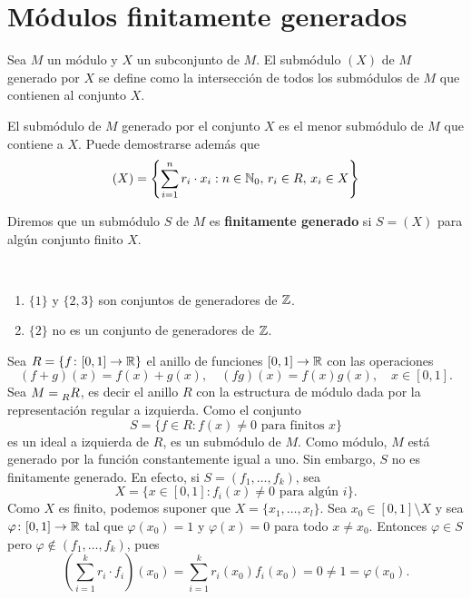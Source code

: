 \chapter{Módulos finitamente generados}

\begin{definition}
	Sea $M$ un módulo y $X$ un subconjunto de $M$. El submódulo $(X)$ de $M$ generado por $X$ se define
	como la intersección de todos los submódulos de $M$ que contienen al conjunto $X$. 
\end{definition}

El submódulo de $M$ generado por el conjunto $X$ es el menor submódulo de $M$ que 
contiene a $X$. 
Puede demostrarse además que 
\[
(X)=\left\{ \sum_{i=1}^n r_i\cdot x_i:n\in\mathbb{N}_0,\,r_i\in R,\,x_i\in X\right\}
\]

\begin{definition}
Diremos que un submódulo $S$ de $M$ es \textbf{finitamente generado} si $S=(X)$ para algún conjunto finito $X$. 
\end{definition}

\begin{examples}\
\begin{enumerate}
	\item $\{1\}$ y $\{2,3\}$ son conjuntos de generadores de $\mathbb{Z}$.
	\item $\{2\}$ no es un conjunto de generadores de $\mathbb{Z}$.
\end{enumerate}	
\end{examples}

\begin{example}
Sea $R=\{f\colon [0,1]\to\mathbb{R}\}$ el anillo de funciones $[0,1]\to\mathbb{R}$ con las operaciones
\[
(f+g)(x)=f(x)+g(x),\quad
(fg)(x)=f(x)g(x),\quad
x\in[0,1].
\]
Sea $M=\prescript{}{R}R$, es
decir el anillo $R$ con la estructura de módulo dada por la representación regular a izquierda. Como el conjunto 
\[
S=\{f\in R:f(x)\ne 0\text{ para finitos $x$}\}
\] 	
es un ideal a izquierda de $R$, es un submódulo de $M$. Como módulo, $M$ está generado por la función constantemente igual a uno. Sin embargo,
$S$ no es finitamente generado. En efecto, si $S=(f_1,\dots,f_k)$, sea 
\[
X=\{x\in[0,1]:f_i(x)\ne 0\text{ para algún $i$}\}.
\]
Como $X$ es finito, podemos suponer que $X=\{x_1,\dots,x_l\}$. Sea $x_0\in[0,1]\setminus X$ y sea $\varphi\colon [0,1]\to\mathbb{R}$ tal que 
$\varphi(x_0)=1$ y $\varphi(x)=0$ para todo $x\ne x_0$. Entonces $\varphi\in S$ pero $\varphi\not\in (f_1,\dots,f_k)$, pues
\[
\left(\sum_{i=1}^k r_i\cdot f_i\right)(x_0)
=\sum_{i=1}^k r_i(x_0)f_i(x_0)=0\ne 1=\varphi(x_0). 
\]
\end{example}


